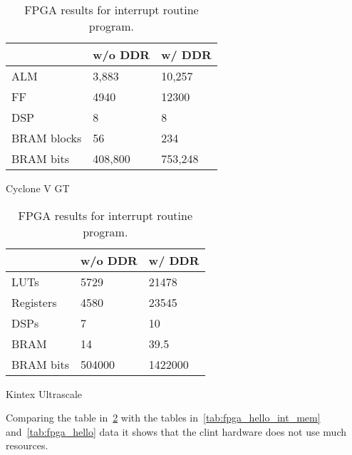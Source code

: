 \begin{table}[!ht]
    \begin{subtable}[h]{0.45\textwidth}
        \centering
        \begin{tabular}{l|l|l|}
            \cline{2-3}
                                              & w/o DDR & w/ DDR  \\ \hline
            \multicolumn{1}{|l|}{ALM}         & 3,883   & 10,257  \\ \hline
            \multicolumn{1}{|l|}{FF}          & 4940    & 12300   \\ \hline
            \multicolumn{1}{|l|}{DSP}         & 8       & 8       \\ \hline
            \multicolumn{1}{|l|}{BRAM blocks} & 56      & 234     \\ \hline
            \multicolumn{1}{|l|}{BRAM bits}   & 408,800 & 753,248 \\ \hline
        \end{tabular}
       \caption{Cyclone V GT}
       \label{tab:cyclone_int}
    \end{subtable}
    \hfill
    \begin{subtable}[h]{0.45\textwidth}
        \centering
        \begin{tabular}{l|l|l|}
            \cline{2-3}
                                            & w/o DDR & w/ DDR  \\ \hline
            \multicolumn{1}{|l|}{LUTs}      & 5729    & 21478   \\ \hline
            \multicolumn{1}{|l|}{Registers} & 4580    & 23545   \\ \hline
            \multicolumn{1}{|l|}{DSPs}      & 7       & 10      \\ \hline
            \multicolumn{1}{|l|}{BRAM}      & 14      & 39.5    \\ \hline
            \multicolumn{1}{|l|}{BRAM bits} & 504000  & 1422000 \\ \hline
        \end{tabular}
        \caption{Kintex Ultrascale}
        \label{tab:kintex_int}
     \end{subtable}
     \caption{FPGA results for interrupt routine program.}
     \label{tab:fpga_int}
\end{table}

Comparing the table in~\ref{tab:fpga_int} with the tables in~\ref{tab:fpga_hello_int_mem} and~\ref{tab:fpga_hello} data it shows that the \acrshort{clint} hardware does not use much resources.

